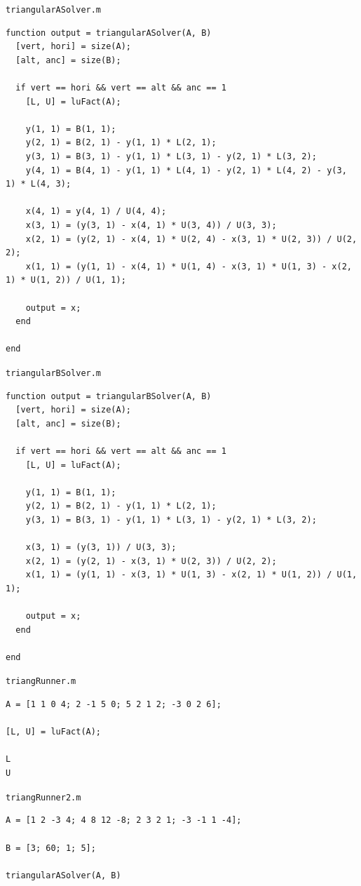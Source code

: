 \documentclass[english,notitlepage,letterpaper, 10pt]{article} %
\begin{document}
\texttt{triangularASolver.m}

\begin{lstlisting}
function output = triangularASolver(A, B)
  [vert, hori] = size(A);
  [alt, anc] = size(B);

  if vert == hori && vert == alt && anc == 1
    [L, U] = luFact(A);

    y(1, 1) = B(1, 1);
    y(2, 1) = B(2, 1) - y(1, 1) * L(2, 1);
    y(3, 1) = B(3, 1) - y(1, 1) * L(3, 1) - y(2, 1) * L(3, 2);
    y(4, 1) = B(4, 1) - y(1, 1) * L(4, 1) - y(2, 1) * L(4, 2) - y(3, 1) * L(4, 3);

    x(4, 1) = y(4, 1) / U(4, 4);
    x(3, 1) = (y(3, 1) - x(4, 1) * U(3, 4)) / U(3, 3);
    x(2, 1) = (y(2, 1) - x(4, 1) * U(2, 4) - x(3, 1) * U(2, 3)) / U(2, 2);
    x(1, 1) = (y(1, 1) - x(4, 1) * U(1, 4) - x(3, 1) * U(1, 3) - x(2, 1) * U(1, 2)) / U(1, 1);

    output = x;
  end
 
end

\end{lstlisting}

\texttt{triangularBSolver.m}

\begin{lstlisting}
function output = triangularBSolver(A, B)
  [vert, hori] = size(A);
  [alt, anc] = size(B);

  if vert == hori && vert == alt && anc == 1
    [L, U] = luFact(A);

    y(1, 1) = B(1, 1);
    y(2, 1) = B(2, 1) - y(1, 1) * L(2, 1);
    y(3, 1) = B(3, 1) - y(1, 1) * L(3, 1) - y(2, 1) * L(3, 2);

    x(3, 1) = (y(3, 1)) / U(3, 3);
    x(2, 1) = (y(2, 1) - x(3, 1) * U(2, 3)) / U(2, 2);
    x(1, 1) = (y(1, 1) - x(3, 1) * U(1, 3) - x(2, 1) * U(1, 2)) / U(1, 1);

    output = x;
  end
 
end

\end{lstlisting}

\texttt{triangRunner.m}

\begin{lstlisting}
A = [1 1 0 4; 2 -1 5 0; 5 2 1 2; -3 0 2 6];

[L, U] = luFact(A);
 
L
U
\end{lstlisting}

\texttt{triangRunner2.m}

\begin{lstlisting}
A = [1 2 -3 4; 4 8 12 -8; 2 3 2 1; -3 -1 1 -4];

B = [3; 60; 1; 5];

triangularASolver(A, B) 
\end{lstlisting}
\end{document}
